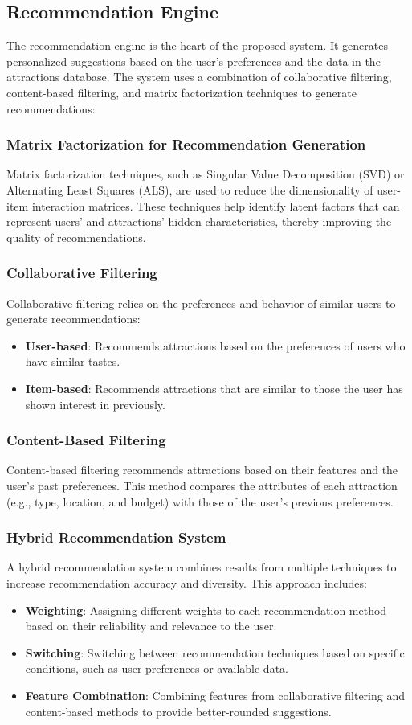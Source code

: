 \subsection{Recommendation Engine}
The recommendation engine is the heart of the proposed system. It generates personalized suggestions based on the user’s preferences and the data in the attractions database. The system uses a combination of collaborative filtering, content-based filtering, and matrix factorization techniques to generate recommendations:
\subsubsection{Matrix Factorization for Recommendation Generation}
Matrix factorization techniques, such as Singular Value Decomposition (SVD) or Alternating Least Squares (ALS), are used to reduce the dimensionality of user-item interaction matrices. These techniques help identify latent factors that can represent users’ and attractions’ hidden characteristics, thereby improving the quality of recommendations.

\subsubsection{Collaborative Filtering}
Collaborative filtering relies on the preferences and behavior of similar users to generate recommendations:
\begin{itemize}
    \item \textbf{User-based}: Recommends attractions based on the preferences of users who have similar tastes.
    \item \textbf{Item-based}: Recommends attractions that are similar to those the user has shown interest in previously.
\end{itemize}
\subsubsection{Content-Based Filtering}
Content-based filtering recommends attractions based on their features and the user’s past preferences. This method compares the attributes of each attraction (e.g., type, location, and budget) with those of the user’s previous preferences.
\subsubsection{Hybrid Recommendation System}
A hybrid recommendation system combines results from multiple techniques to increase recommendation accuracy and diversity. This approach includes:
\begin{itemize}
    \item \textbf{Weighting}: Assigning different weights to each recommendation method based on their reliability and relevance to the user.
    \item \textbf{Switching}: Switching between recommendation techniques based on specific conditions, such as user preferences or available data.
    \item \textbf{Feature Combination}: Combining features from collaborative filtering and content-based methods to provide better-rounded suggestions.
\end{itemize}

